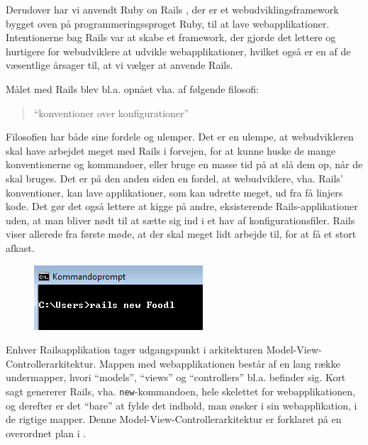 Derudover har vi anvendt Ruby on Rails \cite{rubyonrailswiki}, der er et webudviklingsframework bygget oven på programmeringssproget Ruby, til at lave webapplikationer. Intentionerne bag Rails var at skabe et framework, der gjorde det lettere og hurtigere for webudviklere at udvikle webapplikationer, hvilket også er en af de væsentlige årsager til, at vi vælger at anvende Rails. 

Målet med Rails blev bl.a. opnået vha. af følgende filosofi:
\begin{quote}
``konventioner over konfigurationer''
\end{quote} 

Filosofien har både sine fordele og ulemper. Det er en ulempe, at webudvikleren skal have arbejdet meget med Rails i forvejen, for at kunne huske de mange konventionerne og kommandoer, eller bruge en masse tid på at slå dem op, når de skal bruges. Det er på den anden siden en fordel, at webudviklere, vha. Rails' konventioner, kan lave applikationer, som kan udrette meget, ud fra få linjers kode. Det gør det også lettere at kigge på andre, eksisterende Rails-applikationer uden, at man bliver nødt til at sætte sig ind i et hav af konfigurationsfiler. Rails viser allerede fra første møde, at der skal meget lidt arbejde til, for at få et stort afkast. 

\begin{figure}
	\centering
	\includegraphics[scale=0.6]{billeder/Rails-new-foodl.png}
	\label{fig:Rails-new-foodl}
\end{figure}

Enhver Railsapplikation tager udgangspunkt i arkitekturen Model-View-Controllerarkitektur. Mappen med webapplikationen består af en lang række undermapper, hvori ``models'', ``views'' og ``controllers'' bl.a. befinder sig. Kort sagt genererer Rails, vha. \texttt{new}-kommandoen, hele skelettet for webapplikationen, og derefter er det ``bare'' at fylde det indhold, man ønsker i sin webapplikation, i de rigtige mapper. Denne Model-View-Controllerarkitektur er forklaret på en overordnet plan i .
